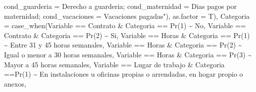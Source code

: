 \documentclass[
]{article}
\newenvironment{Shaded}{\begin{snugshade}}{\end{snugshade}}
\newcommand{\AttributeTok}[1]{\textcolor[rgb]{0.77,0.63,0.00}{#1}}
\newcommand{\FunctionTok}[1]{\textcolor[rgb]{0.00,0.00,0.00}{#1}}
\newcommand{\NormalTok}[1]{#1}
\newcommand{\SpecialCharTok}[1]{\textcolor[rgb]{0.00,0.00,0.00}{#1}}
\newcommand{\StringTok}[1]{\textcolor[rgb]{0.31,0.60,0.02}{#1}}
\begin{document}
\begin{Shaded}
\begin{Highlighting}[]
\StringTok{                                                        \textquotesingle{}cond\_guarderia\textquotesingle{} = \textquotesingle{}Derecho a guarderia\textquotesingle{};}
\StringTok{                                                        \textquotesingle{}cond\_maternidad\textquotesingle{} = \textquotesingle{}Dias pagos por maternidad\textquotesingle{};}
\StringTok{                                                        \textquotesingle{}cond\_vacaciones\textquotesingle{} = \textquotesingle{}Vacaciones pagadas\textquotesingle{}"}\NormalTok{), }\AttributeTok{as.factor =}\NormalTok{ T),}
         \AttributeTok{Categoria =} \FunctionTok{case\_when}\NormalTok{(Variable }\SpecialCharTok{==} \StringTok{\textquotesingle{}Contrato\textquotesingle{}} \SpecialCharTok{\&}\NormalTok{ Categoria }\SpecialCharTok{==} \StringTok{\textquotesingle{}Pr(1)\textquotesingle{}} \SpecialCharTok{\textasciitilde{}} \StringTok{\textquotesingle{}No\textquotesingle{}}\NormalTok{,}
\NormalTok{         Variable }\SpecialCharTok{==} \StringTok{\textquotesingle{}Contrato\textquotesingle{}} \SpecialCharTok{\&}\NormalTok{ Categoria }\SpecialCharTok{==} \StringTok{\textquotesingle{}Pr(2)\textquotesingle{}} \SpecialCharTok{\textasciitilde{}} \StringTok{\textquotesingle{}Si\textquotesingle{}}\NormalTok{,}
\NormalTok{         Variable }\SpecialCharTok{==} \StringTok{\textquotesingle{}Horas\textquotesingle{}} \SpecialCharTok{\&}\NormalTok{ Categoria }\SpecialCharTok{==} \StringTok{\textquotesingle{}Pr(1)\textquotesingle{}} \SpecialCharTok{\textasciitilde{}} \StringTok{\textquotesingle{}Entre 31 y 45 horas semanales\textquotesingle{}}\NormalTok{,}
\NormalTok{         Variable }\SpecialCharTok{==} \StringTok{\textquotesingle{}Horas\textquotesingle{}} \SpecialCharTok{\&}\NormalTok{ Categoria }\SpecialCharTok{==} \StringTok{\textquotesingle{}Pr(2)\textquotesingle{}} \SpecialCharTok{\textasciitilde{}} \StringTok{\textquotesingle{}Igual o menor a 30 horas semanales\textquotesingle{}}\NormalTok{,}
\NormalTok{         Variable }\SpecialCharTok{==} \StringTok{\textquotesingle{}Horas\textquotesingle{}} \SpecialCharTok{\&}\NormalTok{ Categoria }\SpecialCharTok{==} \StringTok{\textquotesingle{}Pr(3)\textquotesingle{}} \SpecialCharTok{\textasciitilde{}} \StringTok{\textquotesingle{}Mayor a 45 horas semanales\textquotesingle{}}\NormalTok{,}
\NormalTok{         Variable }\SpecialCharTok{==} \StringTok{\textquotesingle{}Lugar de trabajo\textquotesingle{}} \SpecialCharTok{\&}\NormalTok{ Categoria }\SpecialCharTok{==}\StringTok{\textquotesingle{}Pr(1)\textquotesingle{}} \SpecialCharTok{\textasciitilde{}} \StringTok{\textquotesingle{}En instalaciones u oficinas propias o arrendadas, en hogar propio o anexos\textquotesingle{}}\NormalTok{,}

\end{Highlighting}
\end{Shaded}
\end{document}
